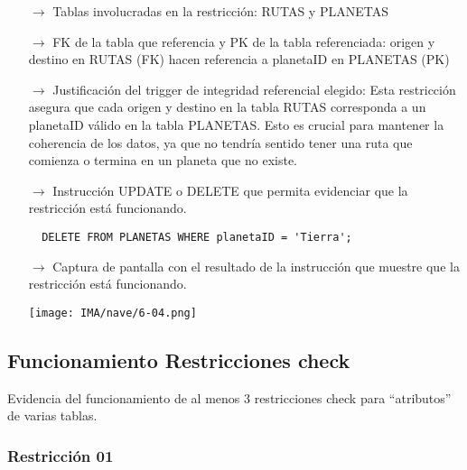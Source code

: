 \begin{itemize}
  \item[$\rightarrow$] Tablas involucradas en la restricción: RUTAS y PLANETAS
  \item[$\rightarrow$] FK de la tabla que referencia y PK de la tabla referenciada: origen y destino en RUTAS (FK) hacen referencia a planetaID en PLANETAS (PK)
  \item[$\rightarrow$] Justificación del trigger de integridad referencial elegido: Esta restricción asegura que cada origen y destino en la tabla RUTAS corresponda a un planetaID válido en la tabla PLANETAS. Esto es crucial para mantener la coherencia de los datos, ya que no tendría sentido tener una ruta que comienza o termina en un planeta que no existe.
  \item[$\rightarrow$] Instrucción UPDATE o DELETE que permita evidenciar que la restricción está funcionando.
  \begin{verbatim}  
  DELETE FROM PLANETAS WHERE planetaID = 'Tierra';  
  \end{verbatim}
  \item[$\rightarrow$] Captura de pantalla con el resultado de la instrucción que muestre que la restricción está funcionando.
    
        \begin{center}
          \texttt{[image: IMA/nave/6-04.png]}
        \end{center}

\end{itemize}


\subsection{Funcionamiento Restricciones check}

Evidencia del funcionamiento de al menos 3 restricciones check para “atributos” de varias
tablas.

\subsubsection*{Restricción 01}

